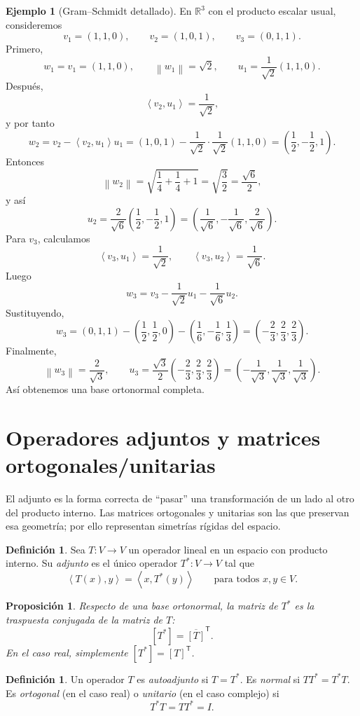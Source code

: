 \documentclass[10pt,a4paper,oneside]{article}
\theoremstyle{plain}
\newtheorem{proposition}[theorem]{Proposición}
\theoremstyle{definition}
\newtheorem{definition}[theorem]{Definición}
\newtheorem{example}[theorem]{Ejemplo}
\theoremstyle{remark}
\newcommand{\R}{\mathbb{R}}
\newcommand{\transpose}{^{\mathsf{T}}}
\newcommand{\angles}[1]{\left\langle #1 \right\rangle}
\newcommand{\norm}[1]{\left\lVert #1 \right\rVert}
\begin{document}
\begin{example}[Gram--Schmidt detallado]
En \(\R^3\) con el producto escalar usual, consideremos
\[
v_1=(1,1,0),\qquad v_2=(1,0,1),\qquad v_3=(0,1,1).
\]
Primero,
\[
w_1=v_1=(1,1,0),
\qquad
\norm{w_1}=\sqrt{2},
\qquad
u_1=\frac{1}{\sqrt2}(1,1,0).
\]
Después,
\[
\angles{v_2,u_1}=\frac{1}{\sqrt2},
\]
y por tanto
\[
w_2=v_2-\angles{v_2,u_1}u_1
=(1,0,1)-\frac{1}{\sqrt2}\cdot\frac{1}{\sqrt2}(1,1,0)
=\left(\frac12,-\frac12,1\right).
\]
Entonces
\[
\norm{w_2}=\sqrt{\frac14+\frac14+1}=\sqrt{\frac32}=\frac{\sqrt6}{2},
\]
y así
\[
u_2=\frac{2}{\sqrt6}\left(\frac12,-\frac12,1\right)=\left(\frac1{\sqrt6},-\frac1{\sqrt6},\frac{2}{\sqrt6}\right).
\]
Para \(v_3\), calculamos
\[
\angles{v_3,u_1}=\frac1{\sqrt2},
\qquad
\angles{v_3,u_2}=\frac1{\sqrt6}.
\]
Luego
\[
w_3=v_3-\frac1{\sqrt2}u_1-\frac1{\sqrt6}u_2.
\]
Sustituyendo,
\[
w_3=(0,1,1)-\left(\frac12,\frac12,0\right)-\left(\frac16,-\frac16,\frac13\right)
=\left(-\frac23,\frac23,\frac23\right).
\]
Finalmente,
\[
\norm{w_3}=\frac{2}{\sqrt3},
\qquad
u_3=\frac{\sqrt3}{2}\left(-\frac23,\frac23,\frac23\right)=\left(-\frac1{\sqrt3},\frac1{\sqrt3},\frac1{\sqrt3}\right).
\]
Así obtenemos una base ortonormal completa.
\end{example}

\section{Operadores adjuntos y matrices ortogonales/unitarias}
\begin{ideaBox}
El adjunto es la forma correcta de ``pasar'' una transformación de un lado al otro del producto interno. Las matrices ortogonales y unitarias son las que preservan esa geometría; por ello representan simetrías rígidas del espacio.
\end{ideaBox}
\begin{definition}
Sea \(T:V\to V\) un operador lineal en un espacio con producto interno. Su \emph{adjunto} es el único operador \(T^*:V\to V\) tal que
\[
\angles{T(x),y}=\angles{x,T^*(y)}
\qquad
\text{para todos }x,y\in V.
\]
\end{definition}

\begin{proposition}
Respecto de una base ortonormal, la matriz de \(T^*\) es la traspuesta conjugada de la matriz de \(T\):
\[
[T^*]=\overline{[T]}\transpose.
\]
En el caso real, simplemente \([T^*]=[T]\transpose\).
\end{proposition}

\begin{definition}
Un operador \(T\) es \emph{autoadjunto} si \(T=T^*\). Es \emph{normal} si \(TT^*=T^*T\). Es \emph{ortogonal} (en el caso real) o \emph{unitario} (en el caso complejo) si
\[
T^*T=TT^*=I.
\]
\end{definition}
\end{document}
